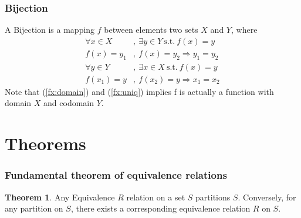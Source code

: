 \documentclass{beamer}
\theoremstyle{definition}
\newtheorem*{thrm}{Theorem}
\begin{document}
\begin{frame}
	\frametitle{Bijection}
	\begin{definition}
		A Bijection is a mapping $f$ between elements two sets $X$ and
		$Y$, where
		\begin{align}
			\label{fx:domain}\forall x \in X&,\ \exists y \in Y\ \text{s.t.}\
			f(x) = y\\
			\label{fx:uniq}f(x) = y_{1}&,\ f(x) = y_{2} \Rightarrow y_{1} =
			y_{2}\\
			\forall y \in Y&,\ \exists x \in X\ \text{s.t.}\ f(x) = y\\
			f(x_{1}) = y&,\  f(x_{2}) = y \Rightarrow x_{1} = x_{2}
		\end{align}
		Note that (\ref{fx:domain}) and (\ref{fx:uniq}) implies f is
		actually a function with domain $X$ and codomain $Y$.
	\end{definition}
\end{frame}


\section{Theorems}

\begin{frame}
	\frametitle{Fundamental theorem of equivalence relations}

	\begin{thrm}
		Any Equivalence $R$ relation on a set $S$ partitions $S$. Conversely, for
		any partition on $S$, there exists a corresponding equivalence
		relation $R$ on $S$.
	\end{thrm}

\end{frame}
\end{document}
